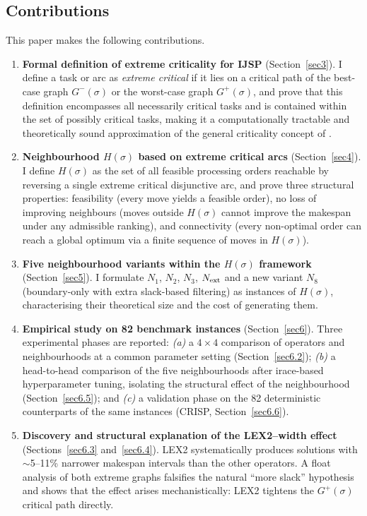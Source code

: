 \documentclass[preprint,12pt]{elsarticle}
\begin{document}
\subsection{Contributions}
\label{sec1.1}

This paper makes the following contributions.
\begin{enumerate}
\item \textbf{Formal definition of extreme criticality for IJSP} (Section~\ref{sec3}). I define a task or arc as \emph{extreme critical} if it lies on a critical path of the best-case graph $G^-(\sigma)$ or the worst-case graph $G^+(\sigma)$, and prove that this definition encompasses all necessarily critical tasks and is contained within the set of possibly critical tasks, making it a computationally tractable and theoretically sound approximation of the general criticality concept of \cite{Artigues2015}.

\item \textbf{Neighbourhood $H(\sigma)$ based on extreme critical arcs} (Section~\ref{sec4}). I define $H(\sigma)$ as the set of all feasible processing orders reachable by reversing a single extreme critical disjunctive arc, and prove three structural properties: feasibility (every move yields a feasible order), no loss of improving neighbours (moves outside $H(\sigma)$ cannot improve the makespan under any admissible ranking), and connectivity (every non-optimal order can reach a global optimum via a finite sequence of moves in $H(\sigma)$).

\item \textbf{Five neighbourhood variants within the $H(\sigma)$ framework} (Section~\ref{sec5}). I formulate $N_1$, $N_2$, $N_3$, $N_{\rm ext}$ and a new variant $N_8$ (boundary-only with extra slack-based filtering) as instances of $H(\sigma)$, characterising their theoretical size and the cost of generating them.

\item \textbf{Empirical study on 82 benchmark instances} (Section~\ref{sec6}). Three experimental phases are reported: \emph{(a)} a $4 \times 4$ comparison of operators and neighbourhoods at a common parameter setting (Section~\ref{sec6.2}); \emph{(b)} a head-to-head comparison of the five neighbourhoods after irace-based hyperparameter tuning, isolating the structural effect of the neighbourhood (Section~\ref{sec6.5}); and \emph{(c)} a validation phase on the 82 deterministic counterparts of the same instances (CRISP, Section~\ref{sec6.6}).

\item \textbf{Discovery and structural explanation of the LEX2--width effect} (Sections~\ref{sec6.3} and~\ref{sec6.4}). LEX2 systematically produces solutions with $\sim$5--11\% narrower makespan intervals than the other operators. A float analysis of both extreme graphs falsifies the natural ``more slack'' hypothesis and shows that the effect arises mechanistically: LEX2 tightens the $G^+(\sigma)$ critical path directly.
\end{enumerate}
\end{document}
